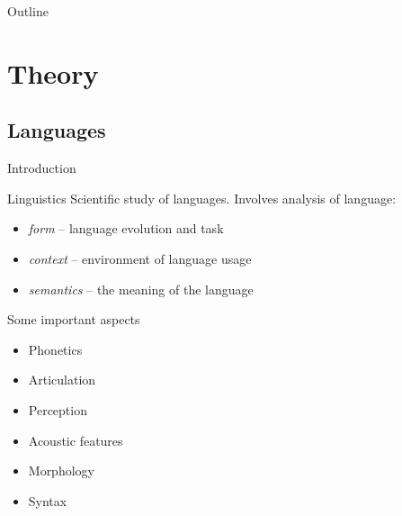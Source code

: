 \documentclass{beamer}
\begin{document}
\begin{frame}{Outline}
	\tableofcontents
\end{frame}

\section{Theory}

\subsection{Languages}

\begin{frame}{Introduction}

\begin{block}{Linguistics}
Scientific study of languages. Involves analysis of language:
\begin{itemize}
\item \textit{form} -- language evolution and task
\item \textit{context} -- environment of language usage
\item \textit{semantics} -- the meaning of the language
\end{itemize}
\end{block}

\begin{block}{Some important aspects}
\begin{itemize}
\item Phonetics
\item Articulation
\item Perception
\item Acoustic features
\item Morphology
\item Syntax
\end{itemize}
\end{block}

\end{frame}
\end{document}

